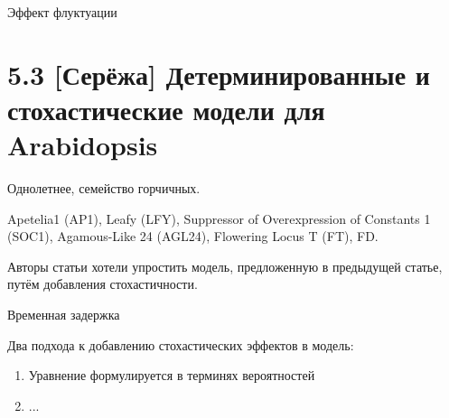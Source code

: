 \documentclass[a4paper,12pt]{article}
\begin{document}
Эффект флуктуации

\section{5.3 [Серёжа] Детерминированные и стохастические модели для Arabidopsis}

Однолетнее, семейство горчичных.

Apetelia1 (AP1), Leafy (LFY), Suppressor of Overexpression of Constants 1 (SOC1), Agamous-Like 24 (AGL24), Flowering Locus T (FT), FD.

Авторы статьи хотели упростить модель, предложенную в предыдущей статье, путём добавления стохастичности.

Временная задержка

Два подхода к добавлению стохастических эффектов в модель:

\begin{enumerate}[noitemsep]
	\item Уравнение формулируется в терминях вероятностей
	\item ...
\end{enumerate}
\end{document}
